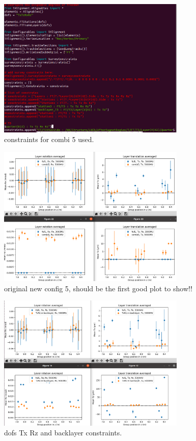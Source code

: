\begin{figure}
  \centering
  \includegraphics[width=0.8\textwidth]{plots/august_13/new_combi5_config.png}
  \caption{constraints for combi 5 used.}
  \label{fig:constraints_c5}
\end{figure}

\begin{figure}
  \centering
  \includegraphics[width=0.8\textwidth]{plots/august_13/newCombi5.png}
  \caption{original new config 5, should be the first good plot to show!!}
  \label{fig:OGconfig5}
\end{figure}

\begin{figure}
  \centering
  \includegraphics[width=0.8\textwidth]{plots/oct_4/TxRz_config5_backlayer.png}
  \caption{dofs Tx Rz and backlayer constraints.}
  \label{fig:oct4}
\end{figure}

